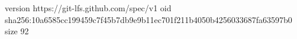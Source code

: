 version https://git-lfs.github.com/spec/v1
oid sha256:10a6585cc199459c7f45b7db9e9b11ec701f211b4050b4256033687fa63597b0
size 92
